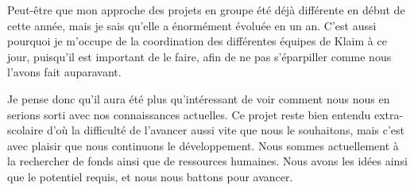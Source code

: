 \documentclass{article}
\begin{document}
		Peut-être que mon approche des projets en groupe été déjà différente en début de cette année, mais je sais qu'elle a énormément évoluée en un an. C'est aussi pourquoi je m'occupe de la coordination des différentes équipes de Klaim à ce jour, puisqu'il est important de le faire, afin de ne pas s'éparpiller comme nous l'avons fait auparavant.
		
		Je pense donc qu'il aura été plus qu'intéressant de voir comment nous nous en serions sorti avec nos connaissances actuelles. Ce projet reste bien entendu extra-scolaire d'où la difficulté de l'avancer aussi vite que nous le souhaitons, mais c'est avec plaisir que nous continuons le développement. Nous sommes actuellement à la rechercher de fonds ainsi que de ressources humaines. Nous avons les idées ainsi que le potentiel requis, et nous nous battons pour avancer.
		
		
\end{document}
